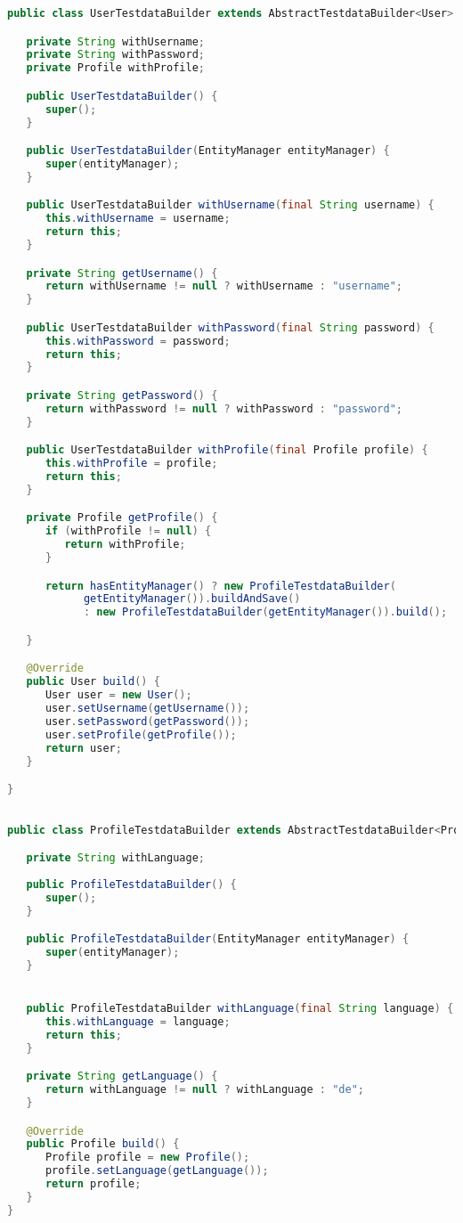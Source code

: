 \begin{lstlisting}[language={JAVA},caption=User Testdatabuilder]
public class UserTestdataBuilder extends AbstractTestdataBuilder<User> {

   private String withUsername;
   private String withPassword;
   private Profile withProfile;

   public UserTestdataBuilder() {
      super();
   }

   public UserTestdataBuilder(EntityManager entityManager) {
      super(entityManager);
   }

   public UserTestdataBuilder withUsername(final String username) {
      this.withUsername = username;
      return this;
   }

   private String getUsername() {
      return withUsername != null ? withUsername : "username";
   }

   public UserTestdataBuilder withPassword(final String password) {
      this.withPassword = password;
      return this;
   }

   private String getPassword() {
      return withPassword != null ? withPassword : "password";
   }

   public UserTestdataBuilder withProfile(final Profile profile) {
      this.withProfile = profile;
      return this;
   }

   private Profile getProfile() {
      if (withProfile != null) {
         return withProfile;
      }

      return hasEntityManager() ? new ProfileTestdataBuilder(
            getEntityManager()).buildAndSave()
            : new ProfileTestdataBuilder(getEntityManager()).build();

   }

   @Override
   public User build() {
      User user = new User();
      user.setUsername(getUsername());
      user.setPassword(getPassword());
      user.setProfile(getProfile());
      return user;
   }

}
\end{lstlisting}

\begin{lstlisting}[language={JAVA},caption=Profile Testdatabuilder]

public class ProfileTestdataBuilder extends AbstractTestdataBuilder<Profile> {

   private String withLanguage;
   
   public ProfileTestdataBuilder() {
      super();
   }

   public ProfileTestdataBuilder(EntityManager entityManager) {
      super(entityManager);
   }


   public ProfileTestdataBuilder withLanguage(final String language) {
      this.withLanguage = language;
      return this;
   }

   private String getLanguage() {
      return withLanguage != null ? withLanguage : "de";
   }

   @Override
   public Profile build() {
      Profile profile = new Profile();
      profile.setLanguage(getLanguage());
      return profile;
   }
}
\end{lstlisting}


